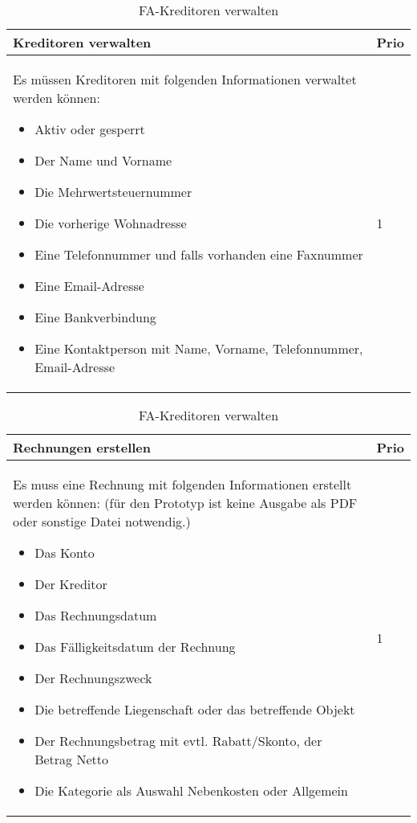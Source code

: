 \begin{table}[H]
  \centering
  \settowidth{}
  \setlength\extrarowheight{2pt}
  \begin{tabulary}{1.0\textwidth}{|m{16cm}|L|}
    \hline
    \textbf{Kreditoren verwalten}&\textbf{Prio}\\
    \hline
    Es müssen Kreditoren mit folgenden Informationen verwaltet werden können:
    \begin{itemize}
      \item Aktiv oder gesperrt
      \item Der Name und Vorname
      \item Die Mehrwertsteuernummer
      \item Die vorherige Wohnadresse
      \item Eine Telefonnummer und falls vorhanden eine Faxnummer
      \item Eine Email-Adresse
      \item Eine Bankverbindung
      \item Eine Kontaktperson mit Name, Vorname, Telefonnummer, Email-Adresse
    \end{itemize} & 1\\
    \hline
  \end{tabulary}
  \caption{FA-Kreditoren verwalten}
  \label{faKreditorenVerwalten}
\end{table}

\begin{table}[H]
  \centering
  \settowidth{}
  \setlength\extrarowheight{2pt}
  \begin{tabulary}{1.0\textwidth}{|m{16cm}|L|}
    \hline
    \textbf{Rechnungen erstellen}&\textbf{Prio}\\
    \hline
    Es muss eine Rechnung mit folgenden Informationen erstellt werden können: (für den Prototyp ist keine Ausgabe als PDF oder sonstige Datei notwendig.)
    \begin{itemize}
      \item Das Konto
      \item Der Kreditor
      \item Das Rechnungsdatum
      \item Das Fälligkeitsdatum der Rechnung
      \item Der Rechnungszweck
      \item Die betreffende Liegenschaft oder das betreffende Objekt
      \item Der Rechnungsbetrag mit evtl. Rabatt/Skonto, der Betrag Netto
      \item Die Kategorie als Auswahl Nebenkosten oder Allgemein
    \end{itemize} & 1\\
    \hline
  \end{tabulary}
  \caption{FA-Kreditoren verwalten}
  \label{faRechnungenErstellen}
\end{table}

